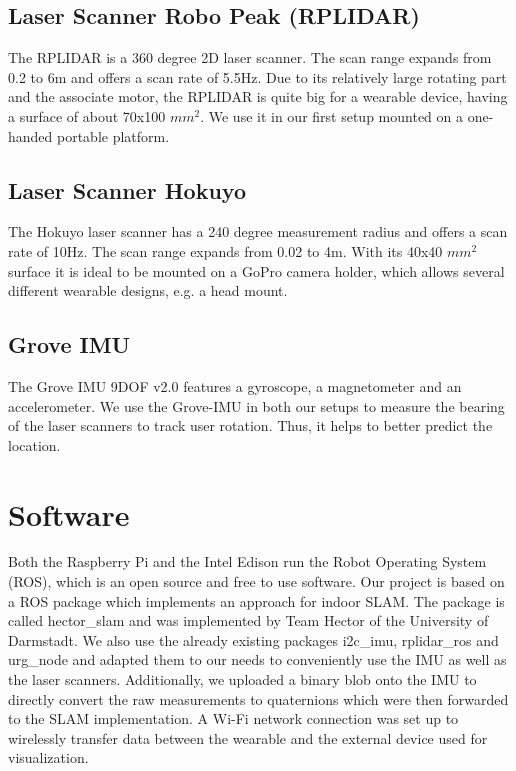 \documentclass{sigchi-ext}
\begin{document}
\subsection{Laser Scanner Robo Peak (RPLIDAR)}
The RPLIDAR is a 360 degree 2D laser scanner. The scan range expands from 0.2 to 6m and offers a scan rate of 5.5Hz. Due to its relatively large rotating part and the associate motor, the RPLIDAR is quite big for a wearable device, having a surface of about 70x100 $mm^2$. We use it in our first setup mounted on a one-handed portable platform.

\subsection{Laser Scanner Hokuyo}
The Hokuyo laser scanner has a 240 degree measurement radius and offers a scan rate of 10Hz. The scan range expands from 0.02 to 4m. With its 40x40 $mm^2$ surface it is ideal to be mounted on a GoPro camera holder, which allows several different wearable designs, e.g. a head mount.

\subsection{Grove IMU}
The Grove IMU 9DOF v2.0 features a gyroscope, a magnetometer and an accelerometer. We use the Grove-IMU in both our setups to measure the bearing of the laser scanners to track user rotation. Thus, it helps to better predict the location.

\section{Software}
Both the Raspberry Pi and the Intel Edison run the Robot Operating System (ROS), which is an open source and free to use software. Our project is based on a ROS package which implements an approach for indoor SLAM. The package is called hector\_slam and was implemented by Team Hector of the University of Darmstadt. We also use the already existing packages i2c\_imu, rplidar\_ros and urg\_node and adapted them to our needs to conveniently use the IMU as well as the laser scanners. Additionally, we uploaded a binary blob onto the IMU to directly convert the raw measurements to quaternions which were then forwarded to the SLAM implementation. A Wi-Fi network connection was set up to wirelessly transfer data between the wearable and the external device used for visualization.
\end{document}
